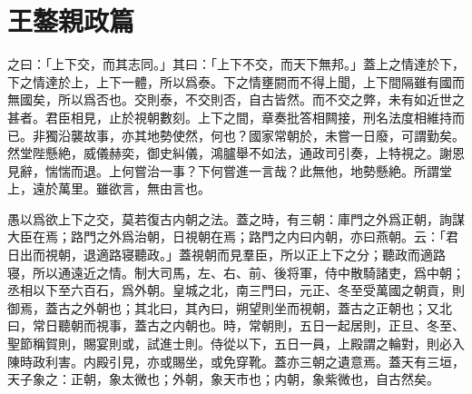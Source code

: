 \section[親政篇\quad{\small 王鏊}]{{\normalsize 王鏊}\quad 親政篇}
之曰：「上下交，而其志同。」其曰：「上下不交，而天下無邦。」蓋上之情達於下，下之情達於上，上下一體，所以爲泰。下之情壅閼而不得上聞，上下間隔雖有國{而}無國矣，所以爲否也。交則泰，不交則否，自古皆然。而不交之弊，未有如近世之甚者。君臣相見，止於視朝數刻。上下之間，章奏批答相闗接，刑名法度相維持而已。非獨沿襲故事，亦其地勢使然，何也？國家常朝於，未嘗一日廢，可謂勤矣。然堂陛懸絶，威儀赫奕，御史糾儀，鴻臚舉不如法，通政司引奏，上特{視}之。謝恩見辭，惴惴而退。上何嘗{治}一事？下何嘗進一言哉？此無他，地勢懸絶。所謂堂上，遠於萬里。雖欲言，無由言也。%

愚以爲欲上下之交，莫若復古内朝之法。蓋之時，有三朝：庫門之外{爲正朝}，詢謀大臣在焉；路門之外爲治朝，日視朝在焉；路門之内曰内朝，亦曰燕朝。云：「君日出而視朝，退適路寝聽政。」蓋視朝而見羣臣，所以正上下之分；聽政而適路寝，所以通遠近之情。制大司馬，左、右、前、後将軍，{侍中}散騎諸吏，爲中朝；丞相以下至六百石，爲外朝。皇城之北，南三門曰，元正、冬至受萬國之朝貢，則御焉，蓋古之外朝也；其北曰，其{內}曰，朔望則坐而視朝，蓋古之正朝也；{又北曰}，常日聽朝而視事，蓋古之内朝也。時，常朝則，五日一起居則，正旦、冬至、聖節稱賀則，賜宴則或，試進士則。侍從以下，五日一員，上殿謂之輪對，則必入{陳}時政利害。内殿引見，亦或賜坐，或免穿靴。蓋亦三朝之遺意焉。蓋天有三垣，天子象之：正朝，象太微也；外朝，象天市也；内朝，象紫微也，自古然矣。%

